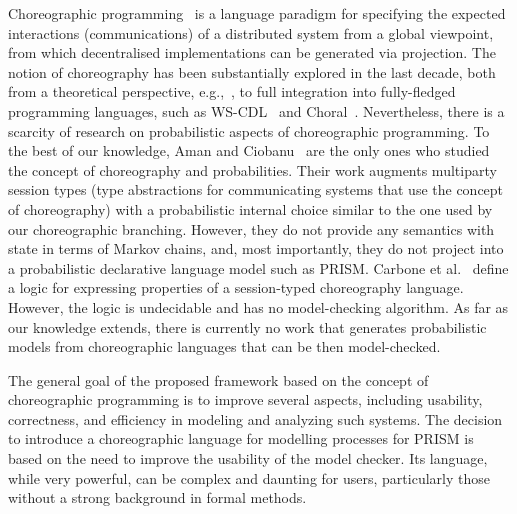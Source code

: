 %
  Choreographic programming~\cite{M23} is a
language paradigm for specifying the expected interactions
(communications) of a distributed system from a global viewpoint,
from which decentralised implementations can be generated via
projection. The notion of choreography has been substantially explored
in the last decade, both from a theoretical perspective,
e.g.,~\cite{CHY12,CM13}, to full integration into fully-fledged
programming languages, such as WS-CDL~\cite{HYC07b} and
Choral~\cite{GMP24}. Nevertheless, there is a scarcity of research on
probabilistic aspects of choreographic programming.
%
To the best of our knowledge, Aman and Ciobanu~\cite{AC19,AC22} are
the only ones who studied the concept of choreography and
probabilities. Their work augments multiparty session types (type
abstractions for communicating systems that use the concept of
choreography) with a probabilistic internal choice similar to the one
used by our choreographic branching. However, they do not provide any
semantics with state in terms of Markov chains, and, most importantly,
they do not project into a probabilistic declarative language model
such as PRISM.
%
Carbone et al.~\cite{CGHL10} define a logic for expressing properties
of a session-typed choreography language. However, the logic is
undecidable and has no model-checking algorithm. %
%
As far as our knowledge extends, there is currently no work that
generates probabilistic models from choreographic languages that can
be then model-checked.



%
The general goal of the proposed framework based on the concept of
choreographic programming is to improve several aspects, including
usability, correctness, and efficiency in modeling and analyzing such
systems.
%
The decision to introduce a choreographic language for modelling
processes for PRISM is based on the need to improve the usability of
the model checker. Its language, while very powerful, can be complex
and daunting for users, particularly those without a strong background
in formal methods.

